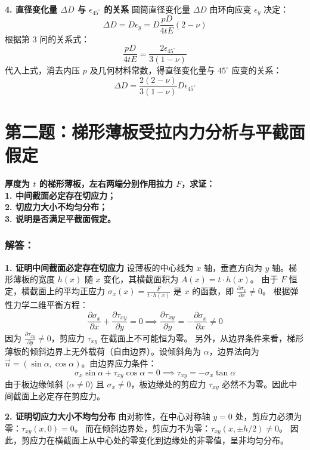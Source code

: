 \documentclass[11pt,a4paper]{ctexrep}
\begin{document}
{\textbf{4. 直径变化量 $\Delta D$ 与 $\epsilon_{45^\circ}$ 的关系}
圆筒直径变化量 $\Delta D$ 由环向应变 $\epsilon_y$ 决定：
\[
\Delta D = D \epsilon_y = D \frac{p D}{4 t E} (2 - \nu)
\]
根据第 3 问的关系式：
\[
\frac{p D}{4 t E} = \frac{2 \epsilon_{45^\circ}}{3(1-\nu)}
\]
代入上式，消去内压 $p$ 及几何材料常数，得直径变化量与 $45^\circ$ 应变的关系：
\[
\Delta D = \frac{2(2-\nu)}{3(1-\nu)} D \epsilon_{45^\circ}
\]




\section*{第二题：梯形薄板受拉内力分析与平截面假定}

\textbf{厚度为 $t$ 的梯形薄板，左右两端分别作用拉力 $F$，求证：}\\
\textbf{1. 中间截面必定存在切应力；}\\
\textbf{2. 切应力大小不均匀分布；}\\
\textbf{3. 说明是否满足平截面假定。}

\subsubsection*{解答：}

\textbf{1. 证明中间截面必定存在切应力}
设薄板的中心线为 $x$ 轴，垂直方向为 $y$ 轴。梯形薄板的宽度 $h(x)$ 随 $x$ 变化，其横截面积为 $A(x) = t \cdot h(x)$。
由于 $F$ 恒定，横截面上的平均正应力 $\sigma_x(x) = \frac{F}{t \cdot h(x)}$ 是 $x$ 的函数，即 $\frac{\partial \sigma_x}{\partial x} \neq 0$。
根据弹性力学二维平衡方程：
\[
\frac{\partial \sigma_x}{\partial x} + \frac{\partial \tau_{xy}}{\partial y} = 0 \implies \frac{\partial \tau_{xy}}{\partial y} = - \frac{\partial \sigma_x}{\partial x} \neq 0
\]
因为 $\frac{\partial \tau_{xy}}{\partial y} \neq 0$，剪应力 $\tau_{xy}$ 在截面上不可能恒为零。
另外，从边界条件来看，梯形薄板的倾斜边界上无外载荷（自由边界）。设倾斜角为 $\alpha$，边界法向为 $\vec{n} = (\sin\alpha, \cos\alpha)$。由边界应力条件：
\[
\sigma_x \sin\alpha + \tau_{xy} \cos\alpha = 0 \implies \tau_{xy} = - \sigma_x \tan\alpha
\]
由于板边缘倾斜 ($\alpha \neq 0$) 且 $\sigma_x \neq 0$，板边缘处的剪应力 $\tau_{xy}$ 必然不为零。因此中间截面上必定存在剪应力。

\textbf{2. 证明切应力大小不均匀分布}
由对称性，在中心对称轴 $y = 0$ 处，剪应力必须为零：$\tau_{xy}(x, 0) = 0$。
而在倾斜边界处，剪应力不为零：$\tau_{xy}(x, \pm h/2) \neq 0$。
因此，剪应力在横截面上从中心处的零变化到边缘处的非零值，呈非均匀分布。

}
\end{document}
